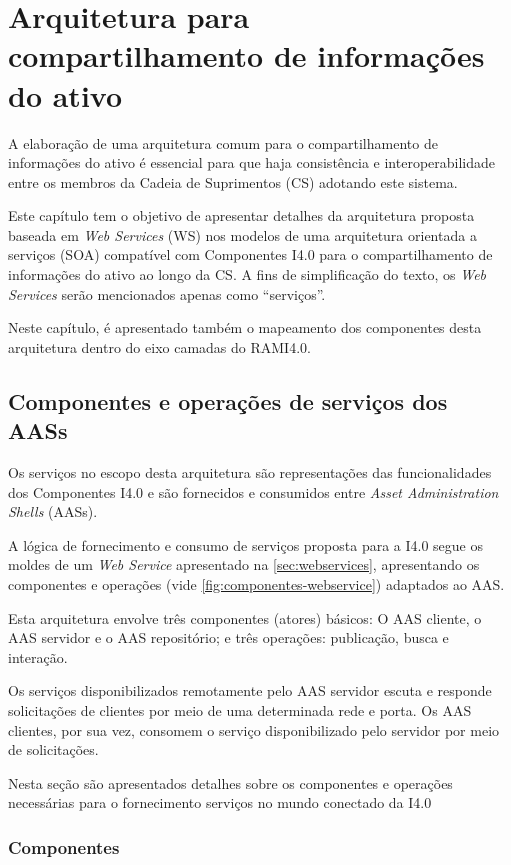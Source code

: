 \chapter{Arquitetura para compartilhamento de informações do ativo}
\label{cha:arquitetura}
	
	A elaboração de uma arquitetura comum para o compartilhamento de informações do ativo é essencial para que haja consistência e interoperabilidade entre os membros da Cadeia de Suprimentos (CS) adotando este sistema.
	
	Este capítulo tem o objetivo de apresentar detalhes da arquitetura proposta baseada em \textit{Web Services} (WS) nos modelos de uma arquitetura orientada a serviços (SOA) compatível com Componentes I4.0 para o compartilhamento de informações do ativo ao longo da CS. A fins de simplificação do texto, os \textit{Web Services} serão mencionados apenas como ``serviços''.
	
	Neste capítulo, é apresentado também o mapeamento dos componentes desta arquitetura dentro do eixo camadas do RAMI4.0.
	
\section{Componentes e operações de serviços dos AASs}

	Os serviços no escopo desta arquitetura são representações das funcionalidades dos Componentes I4.0 e são fornecidos e consumidos entre \textit{Asset Administration Shells} (AASs).
	
	A lógica de fornecimento e consumo de serviços proposta para a I4.0 segue os moldes de um \textit{Web Service} apresentado na \autoref{sec:webservices}, apresentando os componentes e operações (vide \autoref{fig:componentes-webservice}) adaptados ao AAS.
	
	Esta arquitetura envolve três componentes (atores) básicos: O AAS cliente, o AAS servidor e o AAS repositório; e três operações: publicação, busca e interação.

	Os serviços disponibilizados remotamente pelo AAS servidor escuta e responde solicitações de clientes por meio de uma determinada rede e porta. Os AAS clientes, por sua vez, consomem o serviço disponibilizado pelo servidor por meio de solicitações.
	
	Nesta seção são apresentados detalhes sobre os componentes e operações necessárias para o fornecimento serviços no mundo conectado da I4.0
	
\subsection{Componentes}

